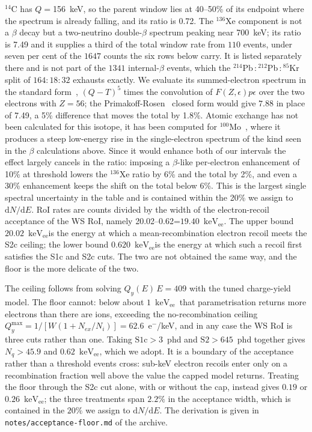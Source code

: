 \documentclass[11pt,a4paper]{article}
\newcommand{\keVee}{\ensuremath{\mathrm{keV_{ee}}}}
\begin{document}
\(^{14}\)C has \(Q=\)\SI{156}{keV}, so the
parent window lies at 40--50\% of its endpoint where the spectrum is
already falling, and its ratio is 0.72. The \(^{136}\)Xe component is
not a \(\beta\) decay but a two-neutrino double-\(\beta\) spectrum peaking near
\SI{700}{keV}; its ratio is 7.49 and it supplies a third of the total
window rate from \(110\) events, under seven per cent of the \(1647\)
counts the six rows below carry\@. It is listed separately there and is not
part of the \(1341\) internal-\(\beta\) events, which the
\(^{214}\)Pb\,:\,\(^{212}\)Pb\,:\,\(^{85}\)Kr split of
\(164{:}18{:}32\) exhausts exactly. We evaluate its summed-electron
spectrum in the standard form~\cite{KotilaIachello}, \((Q-T)^5\) times the
convolution of \(F(Z,\epsilon)p\epsilon\) over the two electrons with
\(Z=56\); the Primakoff-Rosen~\cite{Primakoff:1959chj} closed form would give \(7.88\) in place of
7.49, a 5\% difference that moves the total by 1.8\%. Atomic
exchange has not been calculated for this isotope, it has been computed
for \(^{100}\)Mo~\cite{Nitescu}, where it produces a steep low-energy rise
in the single-electron spectrum of the kind seen in the \(\beta\)
calculations above. Since it would enhance both of our intervals the
effect largely cancels in the ratio: imposing a \(\beta\)-like
per-electron enhancement of 10\% at threshold lowers the \(^{136}\)Xe
ratio by 6\% and the total by 2\%, and even a 30\% enhancement
keeps the shift on the total below 6\%. This is the largest single
spectral uncertainty in the table and is contained within the 20\% we
assign to \(\mathrm{d}N/\mathrm{d}E\). RoI rates are counts divided by the
width of the electron-recoil acceptance of the WS RoI, namely
20.02--0.62=\(19.40\)~\keVee. The upper bound
\(20.02\)~\keVee is the energy at which a
mean-recombination electron recoil meets the S2c ceiling; the lower
bound \(0.620\)~\keVee is the energy at which such a
recoil first satisfies the S1c and S2c cuts. The two are not obtained
the same way, and the floor is the more delicate of the two.

The ceiling follows from
solving \(Q_y(E)\,E=409\) with the tuned charge-yield model. The floor
cannot: below about \(1\)~\keVee\ that parametrisation returns more
electrons than there are ions, exceeding the no-recombination ceiling
\(Q_y^{\max}=1/[W(1+N_{ex}/N_i)]=62.6\)~e\(^-\)/keV, and in any case the
WS RoI is three cuts rather than one. Taking \(\mathrm{S1c}>3\)~phd and
\(\mathrm{S2}>645\)~phd together gives \(N_q>45.9\) and
\(0.62\)~\keVee, which we adopt. It is a boundary of the acceptance
rather than a threshold events cross: sub-keV electron recoils enter only
on a recombination fraction well above the value the capped model
returns. Treating the floor through the S2c cut alone, with or without
the cap, instead gives \(0.19\) or \(0.26\)~\keVee; the three
treatments span \(2.2\%\) in the acceptance width, which is contained in
the \(20\%\) we assign to \(\mathrm{d}N/\mathrm{d}E\). The derivation is
given in \texttt{notes/acceptance-floor.md} of the archive.
\end{document}
